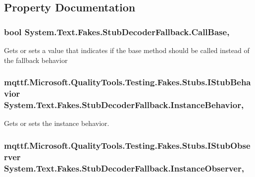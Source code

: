 \subsection{Property Documentation}
\hypertarget{class_system_1_1_text_1_1_fakes_1_1_stub_decoder_fallback_a7c891a66175d4666c860d16c1f0f7ff9}{
\subsubsection[{Call\-Base}]{\setlength{\rightskip}{0pt plus 5cm}bool System.\-Text.\-Fakes.\-Stub\-Decoder\-Fallback.\-Call\-Base\hspace{0.3cm}{\ttfamily [get]}, {\ttfamily [set]}}}\label{class_system_1_1_text_1_1_fakes_1_1_stub_decoder_fallback_a7c891a66175d4666c860d16c1f0f7ff9}


Gets or sets a value that indicates if the base method should be called instead of the fallback behavior

\hypertarget{class_system_1_1_text_1_1_fakes_1_1_stub_decoder_fallback_acb3bc58baf142347ce66c9988562b6aa}{
\subsubsection[{Instance\-Behavior}]{\setlength{\rightskip}{0pt plus 5cm}mqttf.\-Microsoft.\-Quality\-Tools.\-Testing.\-Fakes.\-Stubs.\-I\-Stub\-Behavior System.\-Text.\-Fakes.\-Stub\-Decoder\-Fallback.\-Instance\-Behavior\hspace{0.3cm}{\ttfamily [get]}, {\ttfamily [set]}}}\label{class_system_1_1_text_1_1_fakes_1_1_stub_decoder_fallback_acb3bc58baf142347ce66c9988562b6aa}


Gets or sets the instance behavior.

\hypertarget{class_system_1_1_text_1_1_fakes_1_1_stub_decoder_fallback_a26ba3ab137e9506f5d20d4a1ddf3a224}{
\subsubsection[{Instance\-Observer}]{\setlength{\rightskip}{0pt plus 5cm}mqttf.\-Microsoft.\-Quality\-Tools.\-Testing.\-Fakes.\-Stubs.\-I\-Stub\-Observer System.\-Text.\-Fakes.\-Stub\-Decoder\-Fallback.\-Instance\-Observer\hspace{0.3cm}{\ttfamily [get]}, {\ttfamily [set]}}}\label{class_system_1_1_text_1_1_fakes_1_1_stub_decoder_fallback_a26ba3ab137e9506f5d20d4a1ddf3a224}


